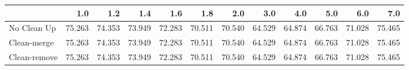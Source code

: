 \begin{tabular}{lrrrrrrrrrrr}
\toprule
{} &    1.0 &    1.2 &    1.4 &    1.6 &    1.8 &    2.0 &    3.0 &    4.0 &    5.0 &    6.0 &    7.0 \\
\midrule
No Clean Up  & 75.263 & 74.353 & 73.949 & 72.283 & 70.511 & 70.540 & 64.529 & 64.874 & 66.763 & 71.028 & 75.465 \\
Clean-merge  & 75.263 & 74.353 & 73.949 & 72.283 & 70.511 & 70.540 & 64.529 & 64.874 & 66.763 & 71.028 & 75.465 \\
Clean-remove & 75.263 & 74.353 & 73.949 & 72.283 & 70.511 & 70.540 & 64.529 & 64.874 & 66.763 & 71.028 & 75.465 \\
\bottomrule
\end{tabular}
